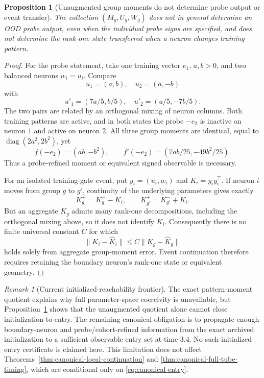 \documentclass[10pt]{article}
\newtheorem{proposition}[theorem]{Proposition}
\theoremstyle{remark}\newtheorem{remark}[theorem]{Remark}
\begin{document}
\begin{proposition}[Unaugmented group moments do not determine probe output or event transfer]
\label{prop:pattern-information-loss}
The collection $(M_g,U_g,W_g)$ does not in general determine an OOD probe
output, even when the individual probe signs are specified, and does not
determine the rank-one state transferred when a neuron changes training
pattern.
\end{proposition}

\begin{proof}
For the probe statement, take one training vector $e_1$, $a,b>0$, and two
balanced neurons $w_i=u_i$. Compare
\[
 u_1=(a,b),\quad u_2=(a,-b)
\]
with
\[
 u'_1=(7a/5,b/5),\quad u'_2=(a/5,-7b/5).
\]
The two pairs are related by an orthogonal mixing of neuron columns. Both
training patterns are active, and in both states the probe $-e_2$ is inactive
on neuron $1$ and active on neuron $2$. All three group moments are identical,
equal to $\operatorname{diag}(2a^2,2b^2)$, yet
\[
 f(-e_2)=(ab,-b^2),\qquad
 f'(-e_2)=(7ab/25,-49b^2/25).
\]
Thus a probe-refined moment or equivalent signed observable is necessary.

For an isolated training-gate event, put
$y_i=(u_i,w_i)$ and $K_i=y_iy_i^\top$. If neuron $i$ moves from group $g$ to
$g'$, continuity of the underlying parameters gives exactly
\[
 K_g^+=K_g^- -K_i,\qquad K_{g'}^+=K_{g'}^-+K_i.
\]
But an aggregate $K_g$ admits many rank-one decompositions, including the
orthogonal mixing above, so it does not identify $K_i$. Consequently there is
no finite universal constant $C$ for which
\[
 \|K_i-\widehat K_i\|\le C\|K_g-\widehat K_g\|
\]
holds solely from aggregate group-moment error. Event continuation therefore
requires retaining the boundary neuron's rank-one state or equivalent
geometry.
\end{proof}

\begin{remark}[Current initialized-reachability frontier]
The exact pattern-moment quotient explains why full parameter-space
coercivity is unavailable, but Proposition~\ref{prop:pattern-information-loss}
shows that the unaugmented quotient alone cannot close initialization-to-entry.
The remaining canonical obligation is to propagate enough boundary-neuron and
probe/cohort-refined information from the exact archived initialization to a
sufficient observable entry set at time $3.4$. No such initialized entry
certificate is claimed here. This limitation does not affect
Theorems~\ref{thm:canonical-local-continuation} and
\ref{thm:canonical-full-tube-timing}, which are conditional only on
\eqref{eq:canonical-entry}.
\end{remark}
\end{document}
